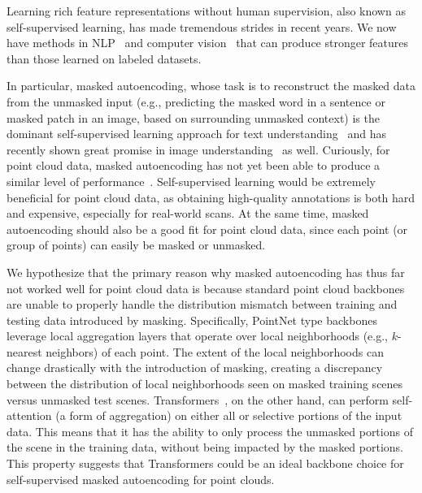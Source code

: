 \documentclass[runningheads]{llncs}
\begin{document}
Learning rich feature representations without human supervision, also known as self-supervised learning, has made tremendous strides in recent years. We now have methods in NLP~\cite{Radford2018-GPT,devlin-etal-2019-bert,radford2021learning} and computer vision~\cite{he2020momentum,pmlr-v119-chen20j,mae,chen2021exploring,bao2021beit} that can produce stronger features than those learned on labeled datasets.

In particular, masked autoencoding, whose task is to reconstruct the masked data from the unmasked input (e.g., predicting the masked word in a sentence or masked patch in an image, based on surrounding unmasked context) is the dominant self-supervised learning approach for text understanding~\cite{devlin-etal-2019-bert,joshi2020spanbert,Lan2020ALBERT,yang2019xlnet} and has recently shown great promise in image understanding~\cite{bao2021beit,mae} as well. Curiously, for point cloud data, masked autoencoding has not yet been able to produce a similar level of performance~\cite{occo,yu2021point,yan2022implicit}.  Self-supervised learning would be extremely beneficial for point cloud data, as obtaining high-quality annotations is both hard and expensive, especially for real-world scans.  At the same time, masked autoencoding should also be a good fit for point cloud data, since each point (or group of points) can easily be masked or unmasked. 

We hypothesize that the primary reason why masked autoencoding has thus far not worked well for point cloud data is because standard point cloud backbones are unable to properly handle the distribution mismatch between training and testing data introduced by masking.  Specifically, PointNet type backbones~\cite{qi2017pointnetplusplus,qi2019deep,qi2017pointnet} leverage local aggregation layers that operate over local neighborhoods (e.g., $k$-nearest neighbors) of each point.  The extent of the local neighborhoods can change drastically with the introduction of masking, creating a discrepancy between the distribution of local neighborhoods seen on masked training scenes versus unmasked test scenes. Transformers~\cite{NIPS2017_3f5ee243}, on the other hand, can perform self-attention (a form of aggregation) on either all or selective portions of the input data.  This means that it has the ability to only process the unmasked portions of the scene in the training data, without being impacted by the masked portions.  This property suggests that Transformers could be an ideal backbone choice for self-supervised masked autoencoding for point clouds. 
\end{document}
